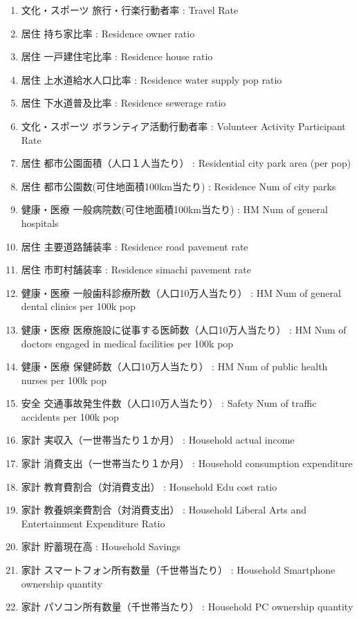 \begin{enumerate}
  \item 文化・スポーツ 旅行・行楽行動者率  :  Travel Rate
  \item 居住 持ち家比率  :  Residence owner ratio
  \item 居住 一戸建住宅比率  :  Residence house ratio
  \item 居住 上水道給水人口比率  :  Residence water supply pop ratio
  \item 居住 下水道普及比率  :  Residence sewerage ratio
  \item 文化・スポーツ ボランティア活動行動者率  :  Volunteer Activity Participant Rate
  \item 居住 都市公園面積（人口１人当たり）  :  Residential city park area (per pop)
  \item 居住 都市公園数(可住地面積100km当たり)  :  Residence Num of city parks
  \item 健康・医療 一般病院数(可住地面積100km当たり)  :  HM Num of general hospitals
  \item 居住 主要道路舗装率  :  Residence road pavement rate
  \item 居住 市町村舗装率  :  Residence simachi pavement rate
  \item 健康・医療 一般歯科診療所数（人口10万人当たり）  :  HM Num of general dental clinics per 100k pop
  \item 健康・医療 医療施設に従事する医師数（人口10万人当たり）  :  HM Num of doctors engaged in medical facilities per 100k pop
  \item 健康・医療 保健師数（人口10万人当たり）  :  HM Num of public health nurses per 100k pop
  \item 安全 交通事故発生件数（人口10万人当たり）  :  Safety Num of traffic accidents per 100k pop
  \item 家計 実収入（一世帯当たり１か月）  :  Household actual income
  \item 家計 消費支出（一世帯当たり１か月）  :  Household consumption expenditure
  \item 家計 教育費割合（対消費支出）  :  Household Edu cost ratio
  \item 家計 教養娯楽費割合（対消費支出）  :  Household Liberal Arts and Entertainment Expenditure Ratio
  \item 家計 貯蓄現在高  :  Household Savings
  \item 家計 スマートフォン所有数量（千世帯当たり）  :  Household Smartphone ownership quantity
  \item 家計 パソコン所有数量（千世帯当たり）  :  Household PC ownership quantity

\end{enumerate}
